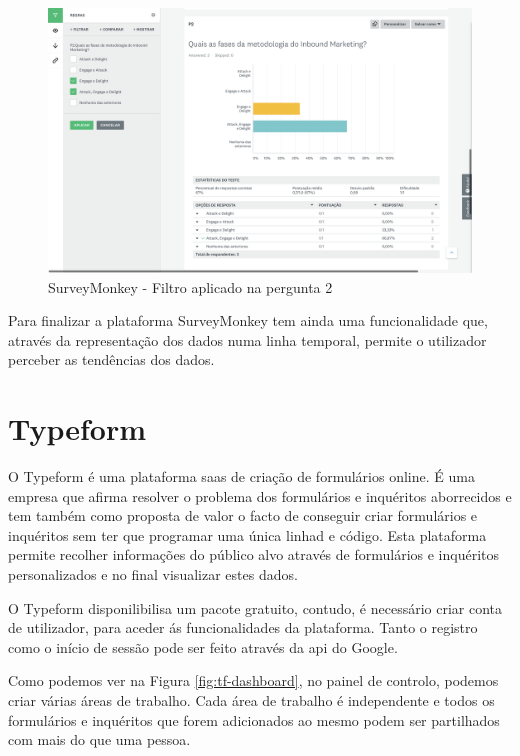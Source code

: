 \begin{figure}[ht!]
	\begin{center}
		\includegraphics[width=1\textwidth]{img/sm/surveymonkey-form-filtro1}
		\caption{SurveyMonkey - Filtro aplicado na pergunta 2 }
		\label{fig:surveymonkey-form-filtro1}
	\end{center}
\end{figure}

\newpage



Para finalizar a plataforma SurveyMonkey tem ainda uma funcionalidade que, através da representação dos dados numa linha temporal, permite o utilizador perceber as tendências dos dados.

\section{Typeform}
\label{typeform}

O Typeform é uma plataforma \acrshort{saas} de criação de formulários online. É uma empresa que afirma resolver o problema dos formulários e inquéritos aborrecidos e tem também como proposta de valor o facto de conseguir criar formulários e inquéritos sem ter que programar uma única linhad e código. Esta plataforma permite recolher informações do público alvo através de formulários e inquéritos personalizados e no final visualizar estes dados. 

O Typeform disponilibilisa um pacote gratuito, contudo, é necessário criar conta de utilizador, para aceder ás funcionalidades da plataforma. Tanto o registro como o início de sessão pode ser feito através da \acrfull{api} do Google.

Como podemos ver na Figura \ref{fig:tf-dashboard}, no painel de controlo, podemos criar várias áreas de trabalho. Cada área de trabalho é independente e todos os formulários e inquéritos que forem adicionados ao mesmo podem ser partilhados com mais do que uma pessoa.
\newpage

